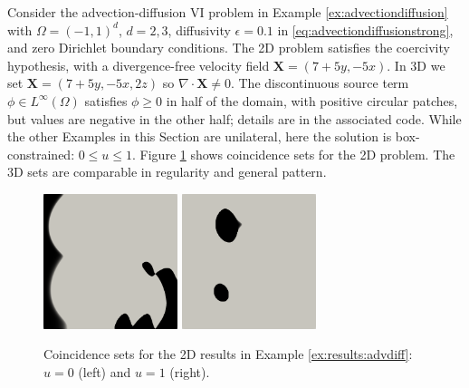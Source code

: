 \documentclass[review,hidelinks,onefignum,onetabnum,final]{siamart220329}  %
\newcommand{\eps}{\epsilon}
\newcommand{\grad}{\nabla}
\newcommand{\bX}{\mathbf{X}}
\begin{document}
\begin{example}  \label{ex:results:advdiff}
Consider the advection-diffusion VI problem in Example \ref{ex:advectiondiffusion} with $\Omega=(-1,1)^d$, $d=2,3$, diffusivity $\eps=0.1$ in \eqref{eq:advectiondiffusionstrong}, and zero Dirichlet boundary conditions.  The 2D problem satisfies the coercivity hypothesis, with a divergence-free velocity field $\bX = (7+5y,-5x)$.  In 3D we set $\bX = (7+5y,-5x,2z)$ so $\grad\cdot\bX \ne 0$.  The discontinuous source term $\phi \in L^\infty(\Omega)$ satisfies $\phi\ge 0$ in half of the domain, with positive circular patches, but values are negative in the other half; details are in the associated code.  While the other Examples in this Section are unilateral, here the solution is box-constrained: $0 \le u \le 1$.  Figure \ref{fig:results:advdiff} shows coincidence sets for the 2D problem.  The 3D sets are comparable in regularity and general pattern.

\begin{figure}[ht]
\centering
\includegraphics[width=0.35\textwidth]{poll2d-zero-set.png} \qquad \includegraphics[width=0.35\textwidth]{poll2d-one-set.png}
\caption{Coincidence sets for the 2D results in Example \ref{ex:results:advdiff}: $u=0$ (left) and $u=1$ (right).}
\label{fig:results:advdiff}
\end{figure}


\end{example}
\end{document}
